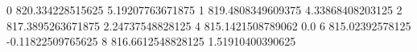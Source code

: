 0 820.334228515625 5.19207763671875
1 819.4808349609375 4.33868408203125
2 817.3895263671875 2.24737548828125
4 815.1421508789062 0.0
6 815.02392578125 -0.11822509765625
8 816.6612548828125 1.51910400390625
